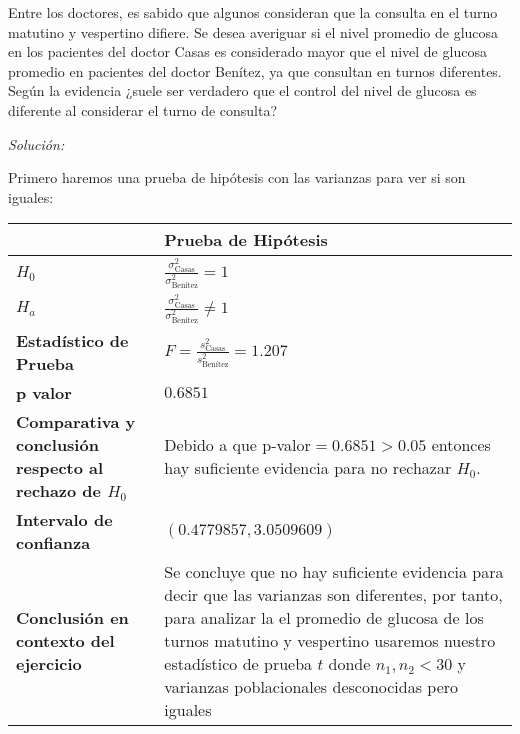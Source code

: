 \documentclass[12pt]{article}
\newenvironment{problem}[2][Problema]{\begin{trivlist}
\item[\hskip \labelsep {\bfseries #1}\hskip \labelsep {\bfseries #2.}]}{\end{trivlist}}
\newenvironment{sol}
    {\emph{Solución:}
    }
    {
    }
\begin{document}
\begin{problem}{D}
Entre los doctores, es sabido que algunos consideran que la consulta en el turno matutino y vespertino difiere. Se desea averiguar si el nivel promedio de glucosa en los pacientes del doctor Casas es considerado mayor que el nivel de glucosa promedio en pacientes del doctor Benítez, ya que consultan en turnos diferentes.  Según la evidencia ¿suele ser verdadero que el control del nivel de glucosa es diferente al considerar el turno de consulta?
\end{problem}

\begin{sol}
Primero haremos una prueba de hipótesis con las varianzas para ver si son iguales:
\begin{table}[h!]
\centering
\begin{tabular}{|>{\raggedright\arraybackslash}m{6cm}|>{\raggedright\arraybackslash}m{6cm}|}
\hline
 & \textbf{Prueba de Hipótesis} \\ \hline
$H_0$ & \vspace{0.5cm}$\frac{\sigma_{\text{Casas}}^2}{\sigma_{\text{Benítez}
}^2}=1$ \vspace{0.5cm}\\ \hline
$H_a$ & \vspace{0.5cm} $\frac{\sigma_{\text{Casas}}^2}{\sigma_{\text{Benítez}
}^2}\neq1$ \vspace{0.5cm}\\ \hline
\textbf{Estadístico de Prueba} & \vspace{0.5cm}$F = \frac{s_\text{Casas}^2}{s_\text{Benítez}^2}=1.207$\vspace{0.5cm} \\ \hline
\textbf{p valor} & $0.6851$ \\ \hline
\textbf{Comparativa y conclusión respecto al rechazo de $H_0$} & Debido a que p-valor$=0.6851>0.05$ entonces hay suficiente evidencia para no rechazar $H_0$. \\ \hline
\textbf{Intervalo de confianza} & $(0.4779857,3.0509609)$ \\ \hline
\textbf{Conclusión en contexto del ejercicio} & Se concluye que no hay suficiente evidencia para decir que las varianzas son diferentes, por tanto, para analizar la el promedio de glucosa de los turnos matutino y vespertino usaremos nuestro estadístico de prueba $t$ donde $n_1 ,n_2 < 30$ y varianzas poblacionales desconocidas pero iguales \\ \hline
\end{tabular}
\label{tab:hipotesis}
\end{table}


\end{sol}
\end{document}
